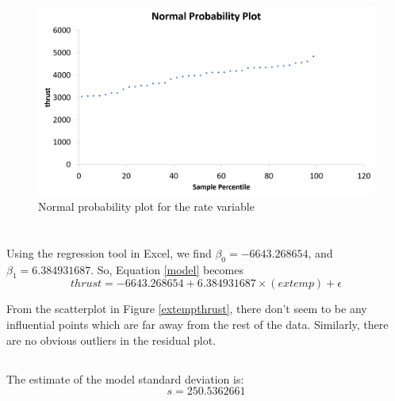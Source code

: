 \documentclass[letterpaper]{article}
\begin{document}
\begin{figure}[H]
 \centering
 \includegraphics[width=\textwidth]{normalplot.png}
 \caption{Normal probability plot for the rate variable}
\end{figure}

\section{}

\subsection{}

Using the regression tool in Excel, we find $\beta_0=-6643.268654$, and
$\beta_1=6.384931687$.
So, Equation \ref{model} becomes
$$ thrust = -6643.268654 + 6.384931687 \times (extemp) + \epsilon$$

From the scatterplot in Figure \ref{extempthrust}, there don't seem to be any
influential points which are far away from the rest of the data. Similarly, there
are no obvious outliers in the residual plot.

\subsection{}
The estimate of the model standard deviation is:
$$s = 250.5362661$$

\subsection{}
\end{document}

